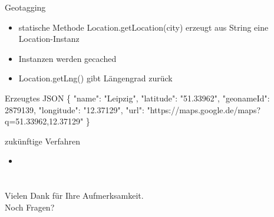 \documentclass[12pt]{beamer}
\begin{document}
\begin{large}
\begin{frame}{Geotagging}
 \begin{itemize}
  \item statische Methode Location.getLocation(city) erzeugt aus String eine Location-Instanz
  \item Instanzen werden gecached
  \item Location.getLng() gibt Längengrad zurück
 \end{itemize}
 
 \begin{block}{Erzeugtes JSON}
 \normalsize \{
 \newline
 \hspace*{0.5cm}"{}name"{}: "{}Leipzig"{},
 \newline
 \hspace*{0.5cm}"{}latitude"{}: "{}51.33962"{},
 \newline
 \hspace*{0.5cm}"{}geonameId"{}: 2879139,
 \newline
 \hspace*{0.5cm}"{}longitude"{}: "{}12.37129"{},
 \newline
 \hspace*{0.5cm}"{}url"{}: 
 \hspace*{0.5cm}"{}https://maps.google.de/maps?q=51.33962,12.37129"{}
 \newline
 \}
 \end{block}
\end{frame}
 

\begin{frame}{zukünftige Verfahren}
 \begin{itemize}
   \item 
 \end{itemize}
\end{frame}


\section*{}
\begin{frame}
\centering
{\Large Vielen Dank für Ihre Aufmerksamkeit. \\ Noch Fragen?}
\end{frame}

\end{large}
\end{document}
